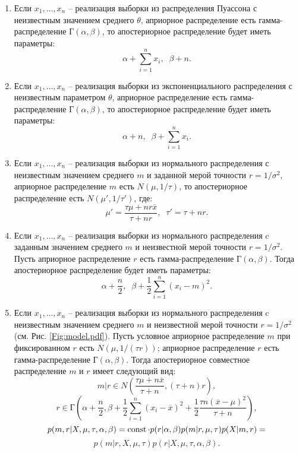 \begin{problem}
\begin{enumerate}
\item Если $x_1, \ldots, x_n$ -- реализация выборки из распределения Пуассона с неизвестным значением среднего $\theta$, 
априорное распределение есть гамма-распределение  $\text{Г}(\alpha, \beta)$, то апостериорное распределение будет иметь параметры:
\[
\alpha + \sum \limits_{i = 1}^n x_i,  \; \; \beta + n.  
\]

\item Если $x_1, \ldots, x_n$ -- реализация выборки из экспоненциального распределения  с неизвестным параметром $\theta$, 
априорное распределение есть гамма-распределение  $\text{Г}(\alpha, \beta)$, то апостериорное распределение будет иметь параметры:
\[
\alpha + n,  \; \; \beta + \sum \limits_{i = 1}^n x_i.  
\]


\item Если $x_1, \ldots, x_n$ -- реализация выборки из нормального распределения  с неизвестным  значением среднего $m$ и заданной мерой точности $r = 1/\sigma^2$, 
априорное распределение $m$ есть  $N(\mu, 1/\tau)$, то апостериорное распределение есть $N(\mu', 1/\tau')$, где:
\[
\mu' = \frac{\tau \mu + n r \overline{x}}{\tau + n r},  \; \; 
\tau' = \tau + n r.  
\]

\item Если $x_1, \ldots, x_n$ -- реализация выборки из нормального распределения  c заданным  значением среднего  $m$ и неизвестной мерой точности $r = 1/\sigma^2$. Пусть априорное распределение  $r$ есть гамма-распределение  $\text{Г}(\alpha, \beta)$. Тогда апостериорное распределение будет иметь параметры:
\[
\alpha + \frac{n}{2},  \; \; \beta + \frac{1}{2} \sum \limits_{i = 1}^n (x_i - m)^2.  
\]

\item Если $x_1, \ldots, x_n$ -- реализация выборки из нормального распределения  c неизвестным значением среднего  $m$ и неизвестной мерой точности $r = 1/\sigma^2$ (см. Рис. \ref{Fig:model.pdf}). Пусть условное априорное распределение $m$ при фиксированном $r$ есть  $N(\mu, 1/(\tau r) )$; априорное распределение  $r$ есть гамма-распределение  $\text{Г}(\alpha, \beta)$. Тогда апостериорное совместное распределение $m$ и $r$ имеет  следующий вид:
\[
m \vert r \in N \left( \frac{\tau \mu + n \overline{x}}{\tau + n}, (\tau + n) r  \right),  
\]
\[
r \in \text{Г} \left( \alpha + \frac{n}{2}, \beta + \frac{1}{2} \sum \limits_{i = 1}^n (x_i - \overline{x})^2 + \frac{1}{2} \frac{\tau n (\overline{x} - \mu)^2}{\tau + n} \right),
\]
\[
p(m, r | X, \mu, \tau, \alpha, \beta) = \mathop{\mathrm{const}}\nolimits \cdot p(r | \alpha, \beta) p(m | r, \mu, \tau) p(X | m, r) =
\]
\[
p(m| r, X, \mu, \tau) p(r | X, \mu, \tau, \alpha, \beta).
\]


\end{enumerate} 

\end{problem}



